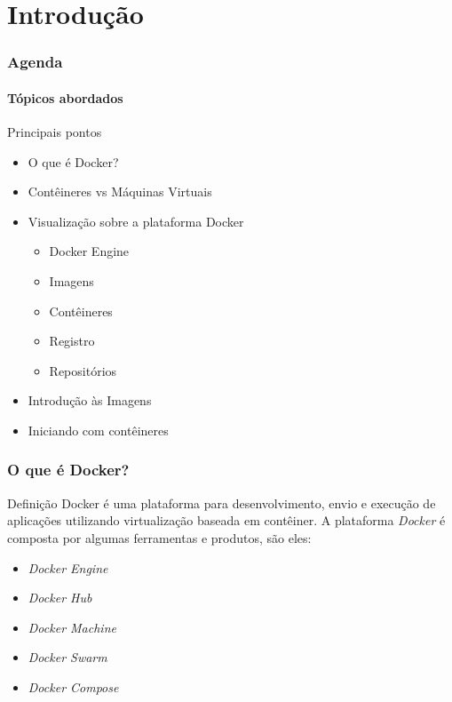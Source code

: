 \documentclass[12pt]{beamer}
\begin{document}
\section{Introdução}
\begin{frame}
  \frametitle{Agenda}
  \framesubtitle{Tópicos abordados}
  \begin{block}{Principais pontos}
		\begin{itemize}
			\item O que é Docker?
			\pause
			\item Contêineres vs Máquinas Virtuais
			\pause
			\item Visualização sobre a plataforma Docker
			\pause
				\begin{itemize}
					\item Docker Engine
					\pause
					\item Imagens
					\pause
					\item Contêineres
					\pause
					\item Registro
					\pause
					\item Repositórios
					\pause
				\end{itemize}
			\item Introdução às Imagens
			\pause
			\item Iniciando com contêineres
  			\end{itemize}
  \end{block}
\end{frame}
\begin{frame}
  \frametitle{O que é Docker?}
  \begin{block}{Definição}
					Docker é uma plataforma para desenvolvimento, envio e execução de
					aplicações utilizando virtualização baseada em contêiner.
					A plataforma \emph{Docker} é composta por algumas ferramentas e
					produtos, são eles:
  \begin{itemize}
		\item \emph{Docker Engine}
		\pause
		\item \emph{Docker Hub}
		\pause
		\item \emph{Docker Machine}
		\pause
		\item \emph{Docker Swarm}
		\pause
		\item \emph{Docker Compose}
  \end{itemize}
  \end{block}
\end{frame}
\end{document}
